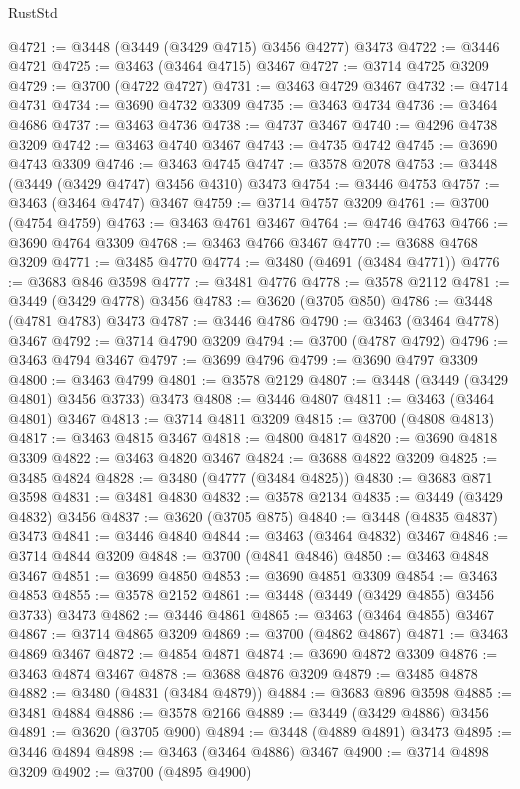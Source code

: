 \begin{lexlean}{RustStd}
\begin{coremodule}
{\begin{coremodule}
{{{{{{{{{{{{{{{{{{{{{{{{{{{{{{{{{{{{{{{{{{{{{{{{{{{{{{{{{{{{{{{{{{{{{{{{{{{{{{{{{{{{{@4721 := @3448 (@3449 (@3429 @4715) @3456 @4277) @3473
@4722 := @3446 @4721
@4725 := @3463 (@3464 @4715) @3467
@4727 := @3714 @4725 @3209
@4729 := @3700 (@4722 @4727)
@4731 := @3463 @4729 @3467
@4732 := @4714 @4731
@4734 := @3690 @4732 @3309
@4735 := @3463 @4734
@4736 := @3464 @4686
@4737 := @3463 @4736
@4738 := @4737 @3467
@4740 := @4296 @4738 @3209
@4742 := @3463 @4740 @3467
@4743 := @4735 @4742
@4745 := @3690 @4743 @3309
@4746 := @3463 @4745
@4747 := @3578 @2078
@4753 := @3448 (@3449 (@3429 @4747) @3456 @4310) @3473
@4754 := @3446 @4753
@4757 := @3463 (@3464 @4747) @3467
@4759 := @3714 @4757 @3209
@4761 := @3700 (@4754 @4759)
@4763 := @3463 @4761 @3467
@4764 := @4746 @4763
@4766 := @3690 @4764 @3309
@4768 := @3463 @4766 @3467
@4770 := @3688 @4768 @3209
@4771 := @3485 @4770
@4774 := @3480 (@4691 (@3484 @4771))
@4776 := @3683 @846 @3598
@4777 := @3481 @4776
@4778 := @3578 @2112
@4781 := @3449 (@3429 @4778) @3456
@4783 := @3620 (@3705 @850)
@4786 := @3448 (@4781 @4783) @3473
@4787 := @3446 @4786
@4790 := @3463 (@3464 @4778) @3467
@4792 := @3714 @4790 @3209
@4794 := @3700 (@4787 @4792)
@4796 := @3463 @4794 @3467
@4797 := @3699 @4796
@4799 := @3690 @4797 @3309
@4800 := @3463 @4799
@4801 := @3578 @2129
@4807 := @3448 (@3449 (@3429 @4801) @3456 @3733) @3473
@4808 := @3446 @4807
@4811 := @3463 (@3464 @4801) @3467
@4813 := @3714 @4811 @3209
@4815 := @3700 (@4808 @4813)
@4817 := @3463 @4815 @3467
@4818 := @4800 @4817
@4820 := @3690 @4818 @3309
@4822 := @3463 @4820 @3467
@4824 := @3688 @4822 @3209
@4825 := @3485 @4824
@4828 := @3480 (@4777 (@3484 @4825))
@4830 := @3683 @871 @3598
@4831 := @3481 @4830
@4832 := @3578 @2134
@4835 := @3449 (@3429 @4832) @3456
@4837 := @3620 (@3705 @875)
@4840 := @3448 (@4835 @4837) @3473
@4841 := @3446 @4840
@4844 := @3463 (@3464 @4832) @3467
@4846 := @3714 @4844 @3209
@4848 := @3700 (@4841 @4846)
@4850 := @3463 @4848 @3467
@4851 := @3699 @4850
@4853 := @3690 @4851 @3309
@4854 := @3463 @4853
@4855 := @3578 @2152
@4861 := @3448 (@3449 (@3429 @4855) @3456 @3733) @3473
@4862 := @3446 @4861
@4865 := @3463 (@3464 @4855) @3467
@4867 := @3714 @4865 @3209
@4869 := @3700 (@4862 @4867)
@4871 := @3463 @4869 @3467
@4872 := @4854 @4871
@4874 := @3690 @4872 @3309
@4876 := @3463 @4874 @3467
@4878 := @3688 @4876 @3209
@4879 := @3485 @4878
@4882 := @3480 (@4831 (@3484 @4879))
@4884 := @3683 @896 @3598
@4885 := @3481 @4884
@4886 := @3578 @2166
@4889 := @3449 (@3429 @4886) @3456
@4891 := @3620 (@3705 @900)
@4894 := @3448 (@4889 @4891) @3473
@4895 := @3446 @4894
@4898 := @3463 (@3464 @4886) @3467
@4900 := @3714 @4898 @3209
@4902 := @3700 (@4895 @4900)
}}}}}}}}}}}}}}}}}}}}}}}}}}}}}}}}}}}}}}}}}}}}}}}}}}}}}}}}}}}}}}}}}}}}}}}}}}}}}}}}}}}}}
\end{coremodule}}
\end{coremodule}
\end{lexlean}
